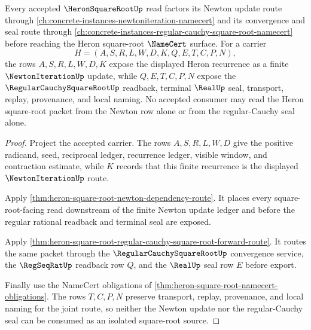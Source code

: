 \begin{theorem}
\label{thm:heron-square-root-newton-regular-cauchy-bridge}
Every accepted $\HeronSquareRootUp$ read factors its Newton update route through \autoref{ch:concrete-instances-newtoniteration-namecert} and its convergence and seal route through \autoref{ch:concrete-instances-regular-cauchy-square-root-namecert} before reaching the Heron square-root $\NameCert$ surface. For a carrier
$$
H=(A,S,R,L,W,D,K,Q,E,T,C,P,N),
$$
the rows $A,S,R,L,W,D,K$ expose the displayed Heron recurrence as a finite $\NewtonIterationUp$ update, while $Q,E,T,C,P,N$ expose the $\RegularCauchySquareRootUp$ readback, terminal $\RealUp$ seal, transport, replay, provenance, and local naming. No accepted consumer may read the Heron square-root packet from the Newton row alone or from the regular-Cauchy seal alone.
\end{theorem}
\begin{proof}
Project the accepted carrier. The rows $A,S,R,L,W,D$ give the positive radicand, seed, reciprocal ledger, recurrence ledger, visible window, and contraction estimate, while $K$ records that this finite recurrence is the displayed $\NewtonIterationUp$ route.

Apply \autoref{thm:heron-square-root-newton-dependency-route}. It places every square-root-facing read downstream of the finite Newton update ledger and before the regular rational readback and terminal seal are exposed.

Apply \autoref{thm:heron-square-root-regular-cauchy-square-root-forward-route}. It routes the same packet through the $\RegularCauchySquareRootUp$ convergence service, the $\RegSeqRatUp$ readback row $Q$, and the $\RealUp$ seal row $E$ before export.

Finally use the NameCert obligations of \autoref{thm:heron-square-root-namecert-obligations}. The rows $T,C,P,N$ preserve transport, replay, provenance, and local naming for the joint route, so neither the Newton update nor the regular-Cauchy seal can be consumed as an isolated square-root source.
\end{proof}
